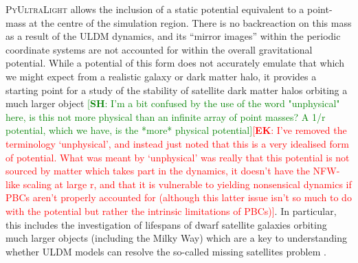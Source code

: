 \documentclass[a4paper,11pt]{article}
\newcommand{\PyUltraLight}{\textsc{PyUltraLight}\xspace}
\newcommand{\ek}[1]{\textcolor{red}{[{\bf EK}: #1]}}
\newcommand{\sh}[1]{\textcolor{green}{[{\bf SH}: #1]}}
\begin{document}
\PyUltraLight allows the inclusion of a static potential equivalent to a point-mass  at the centre of the simulation region.  There is no backreaction on this mass as a result of the ULDM dynamics, and its ``mirror images'' within the periodic coordinate systems are not accounted for within the overall gravitational potential. While a potential of this form does not accurately emulate that which we might expect from a realistic galaxy or dark matter halo, it provides a starting point for a study of the stability of satellite dark matter halos orbiting a much larger object \sh{I'm a bit confused by the use of the word "unphysical" here, is this not more physical than an infinite array of point masses? A 1/r potential, which we have, is the *more* physical potential}\ek{I've removed the terminology `unphysical', and instead just noted that this is a very idealised form of potential. What was meant by `unphysical' was really that this potential is not sourced by matter which takes part in the dynamics, it doesn't have the NFW-like scaling at large r, and that it is vulnerable to yielding nonsensical dynamics if PBCs aren't properly accounted for (although this latter issue isn't so much to do with the potential but rather the intrinsic limitations of PBCs)}. In particular, this includes the investigation of lifespans of dwarf satellite galaxies orbiting much larger objects (including the Milky Way) which are a key to understanding whether ULDM models can resolve the so-called missing satellites problem \cite{Weinberg2015}.
\end{document}
